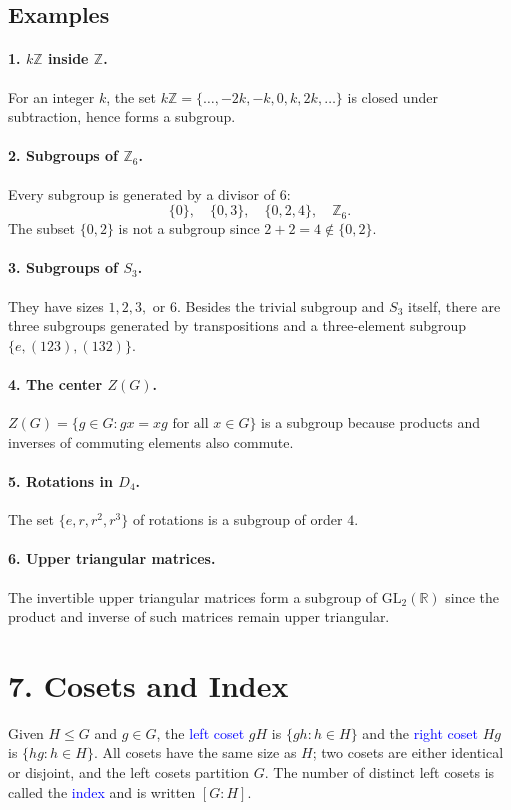 \documentclass[12pt]{article}
\begin{document}
\subsection*{Examples}
\paragraph{1. $k\mathbb{Z}$ inside $\mathbb{Z}$.}
For an integer $k$, the set $k\mathbb{Z}=\{\ldots,-2k,-k,0,k,2k,\ldots\}$ is closed under subtraction, hence forms a subgroup.

\paragraph{2. Subgroups of $\mathbb{Z}_6$.}
Every subgroup is generated by a divisor of $6$:
\[
\{0\},\quad \{0,3\},\quad \{0,2,4\},\quad \mathbb{Z}_6.
\]
The subset $\{0,2\}$ is not a subgroup since $2+2=4\notin\{0,2\}$.

\paragraph{3. Subgroups of $S_3$.}
They have sizes $1,2,3,$ or $6$.
Besides the trivial subgroup and $S_3$ itself, there are three subgroups generated by transpositions and a three-element subgroup $\{e,(123),(132)\}$.

\paragraph{4. The center $Z(G)$.}
$Z(G)=\{g\in G: gx=xg \text{ for all } x\in G\}$ is a subgroup because products and inverses of commuting elements also commute.

\paragraph{5. Rotations in $D_4$.}
The set $\{e,r,r^2,r^3\}$ of rotations is a subgroup of order $4$.

\paragraph{6. Upper triangular matrices.}
The invertible upper triangular matrices form a subgroup of $\mathrm{GL}_2(\mathbb{R})$ since the product and inverse of such matrices remain upper triangular.

\section*{7. Cosets and Index}
Given $H\leq G$ and $g\in G$, the \textcolor{blue}{left coset} $gH$ is $\{gh:h\in H\}$ and the \textcolor{blue}{right coset} $Hg$ is $\{hg:h\in H\}$.
All cosets have the same size as $H$; two cosets are either identical or disjoint, and the left cosets partition $G$.
The number of distinct left cosets is called the \textcolor{blue}{index} and is written $[G:H]$.
\end{document}
